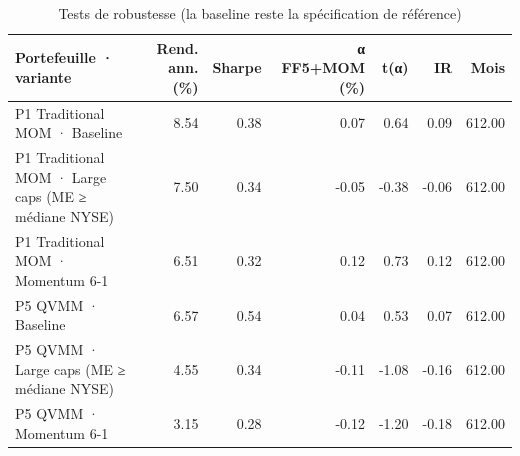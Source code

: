 \begin{table}[htbp]
\centering
\small
\caption{Tests de robustesse (la baseline reste la spécification de référence)}
\label{tab:T11_robustesse}
\begin{tabular}{lrrrrrr}
\toprule
Portefeuille · variante & Rend. ann. (\%) & Sharpe & α FF5+MOM (\%) & t(α) & IR & Mois \\
\midrule
P1 Traditional MOM · Baseline & 8.54 & 0.38 & 0.07 & 0.64 & 0.09 & 612.00 \\
P1 Traditional MOM · Large caps (ME ≥ médiane NYSE) & 7.50 & 0.34 & -0.05 & -0.38 & -0.06 & 612.00 \\
P1 Traditional MOM · Momentum 6-1 & 6.51 & 0.32 & 0.12 & 0.73 & 0.12 & 612.00 \\
P5 QVMM · Baseline & 6.57 & 0.54 & 0.04 & 0.53 & 0.07 & 612.00 \\
P5 QVMM · Large caps (ME ≥ médiane NYSE) & 4.55 & 0.34 & -0.11 & -1.08 & -0.16 & 612.00 \\
P5 QVMM · Momentum 6-1 & 3.15 & 0.28 & -0.12 & -1.20 & -0.18 & 612.00 \\
\bottomrule
\end{tabular}
\end{table}